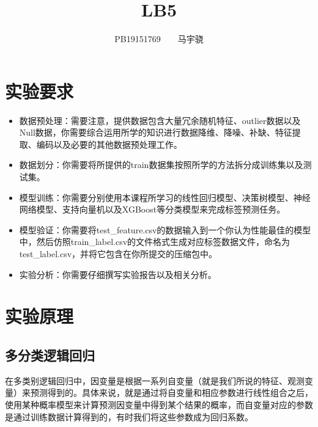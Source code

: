 \documentclass[UTF8,a4paper,AutoFakeBold,AutoFakeSlant]{article}
\title{\textbf{\textsf{{\textsf{LB5} \heiti{机器学习概论}}}}}
\author{\ssong PB19151769~~~~马宇骁}
\date{}
\begin{document}
\maketitle

\tableofcontents
\newpage




\section{实验要求}

\begin{itemize}
  \item 数据预处理：需要注意，提供数据包含大量冗余随机特征、outlier数据以及Null数据，你需要综合运用所学的知识进行数据降维、降噪、补缺、特征提取、编码以及必要的其他数据预处理工作。
  \item 数据划分：你需要将所提供的train数据集按照所学的方法拆分成训练集以及测试集。
  \item 模型训练：你需要分别使用本课程所学习的线性回归模型、决策树模型、神经网络模型、支持向量机以及XGBoost等分类模型来完成标签预测任务。
  \item 模型验证：你需要将test\_feature.csv的数据输入到一个你认为性能最佳的模型中，然后仿照train\_label.csv的文件格式生成对应标签数据文件，命名为test\_label.csv，并将它包含在你所提交的压缩包中。
  \item 实验分析：你需要仔细撰写实验报告以及相关分析。
\end{itemize}








\section{实验原理}

\subsection{多分类逻辑回归}

在多类别逻辑回归中，因变量是根据一系列自变量（就是我们所说的特征、观测变量）来预测得到的。具体来说，就是通过将自变量和相应参数进行线性组合之后，使用某种概率模型来计算预测因变量中得到某个结果的概率，而自变量对应的参数是通过训练数据计算得到的，有时我们将这些参数成为回归系数。
\end{document}
